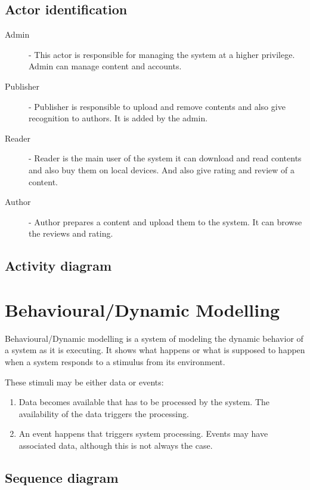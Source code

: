 	\subsection{Actor identification}

	\begin{description}
		\item[Admin] - This actor is responsible for managing the system at a higher privilege. Admin can manage content and accounts.
		\item[Publisher] - Publisher is responsible to upload and remove contents and also give recognition to authors. It is added by the admin.
		\item[Reader] - Reader is the main user of the system it can download and read contents and also buy them on local devices. And also give rating and review of a content.
		\item[Author] - Author prepares a content and upload them to the system. It can browse the reviews and rating.
	\end{description}

	

	

	\subsection{Activity diagram}

	


\section{Behavioural/Dynamic Modelling}

Behavioural/Dynamic modelling is a system of modeling the dynamic behavior of a system as it is executing. It shows what happens or what is supposed to happen when a system responds to a stimulus from its environment.

These stimuli may be either data or events:
	\begin{enumerate}
		\item Data becomes available that has to be processed by the system. The availability of the data triggers the processing.
		\item An event happens that triggers system processing. Events may have associated data, although this is not always the case.
	\end{enumerate}

	\subsection{Sequence diagram}

